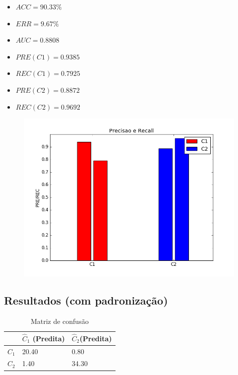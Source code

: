 \documentclass[11pt,a4paper]{article}
\numberwithin{equation}{section}
\begin{document}
\begin{minipage}{.5\textwidth}
\begin{itemize}
\item $ACC =  90.33 \%$
\item $ERR =  9.67 \%$
\item $AUC =  0.8808 $
\item $PRE(C1) =  0.9385 $
\item $REC(C1) =  0.7925 $
\item $PRE(C2) =  0.8872 $
\item $REC(C2) =  0.9692 $
\end{itemize}
\end{minipage}%
\begin{minipage}{.5\textwidth}
\begin{figure}[H]
\centering
  \includegraphics[width=\linewidth]{../img/perc_rec.png}
  \label{fig:percep}
\end{figure}
\end{minipage}%

\subsection{Resultados (com padronização)}
\begin{table}[H]
\centering
\caption{Matriz de confusão}
\begin{tabular}{l l l}
\hline
 & \textbf{$\hat{C}_1$ (Predita)} & \textbf{$\hat{C}_2$(Predita)}\\
\hline
$C_1$ & 20.40&0.80\\ 
$C_2$ & 1.40&34.30\\ 
\hline
\end{tabular}
\end{table}
\end{document}
